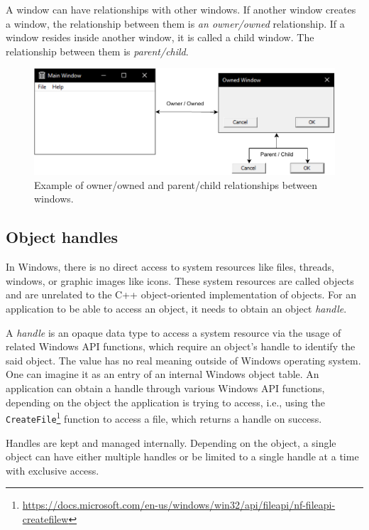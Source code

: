 A window can have relationships with other windows. If another window creates a window, the relationship between them is \textit{an owner/owned} relationship. If a window resides inside another window, it is called a child window. The relationship between them is \textit{parent/child}.\cite{WinWindow}
\begin{figure}[htbp]
	\centering
	\includegraphics[width=\columnwidth]{obrazky-figures/windows_rels.pdf}
	\caption{Example of owner/owned and parent/child relationships between windows.}
	\label{windowsExample}
\end{figure}

\subsection{Object handles}
\label{ch2handle}
In Windows, there is no direct access to system resources like files, threads, windows, or graphic images like icons. These system resources are called objects and are unrelated to the C++ object-oriented implementation of objects. For an application to be able to access an object, it needs to obtain an object \textit{handle}.

A \textit{handle} is an opaque data type to access a system resource via the usage of related Windows API functions, which require an object's handle to identify the said object. The value has no real meaning outside of Windows operating system. One can imagine it as an entry of an internal Windows object table. An application can obtain a handle through various Windows API functions, depending on the object the application is trying to access, i.e., using the \lstinline{CreateFile}\footnote{\url{https://docs.microsoft.com/en-us/windows/win32/api/fileapi/nf-fileapi-createfilew}} function to access a file, which returns a handle on success.\cite{HandlesAndObjects}

Handles are kept and managed internally. Depending on the object, a single object can have either multiple handles or be limited to a single handle at a time with exclusive access.\cite{WinHandleLimits}

